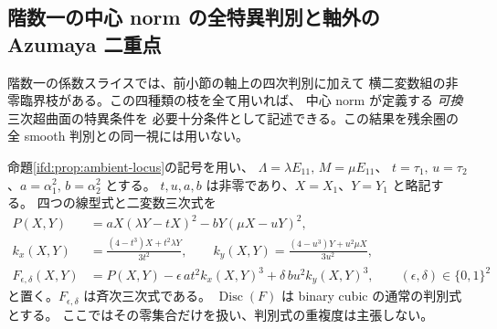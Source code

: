 \subsection{階数一の中心 norm の全特異判別と軸外の Azumaya 二重点}
\label{ifn:subsec:full-norm}

階数一の係数スライスでは、前小節の軸上の四次判別に加えて
横二変数組の非零臨界枝がある。この四種類の枝を全て用いれば、
中心 norm が定義する \emph{可換}三次超曲面の特異条件を
必要十分条件として記述できる。この結果を残余圏の全 smooth
判別との同一視には用いない。

命題\ref{ifd:prop:ambient-locus}の記号を用い、
$\Lambda=\lambda E_{11},\,M=\mu E_{11}$、
$t=\tau_1,\,u=\tau_2$、$a=\alpha_1^2,\,b=\alpha_2^2$ とする。
$t,u,a,b$ は非零であり、$X=X_1$、$Y=Y_1$ と略記する。
四つの線型式と二変数三次式を
\begin{equation}\label{ifn:eq:branch-functions}
 \begin{split}
 P(X,Y)&=aX(\lambda Y-tX)^2-bY(\mu X-uY)^2,\\
 k_x(X,Y)&=\frac{(4-t^3)X+t^2\lambda Y}{3t^2},\qquad
 k_y(X,Y)=\frac{(4-u^3)Y+u^2\mu X}{3u^2},\\
 F_{\epsilon,\delta}(X,Y)
   &=P(X,Y)-\epsilon\,at^2k_x(X,Y)^3
               +\delta\,bu^2k_y(X,Y)^3,
 \qquad (\epsilon,\delta)\in\{0,1\}^2
 \end{split}
\end{equation}
と置く。$F_{\epsilon,\delta}$ は斉次三次式である。
$\operatorname{Disc}(F)$ は binary cubic の通常の判別式とする。
ここではその零集合だけを扱い、判別式の重複度は主張しない。

